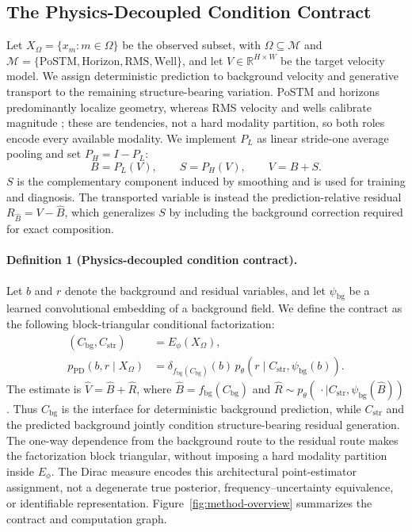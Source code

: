 \documentclass[letterpaper]{article}
\begin{document}
\subsection{The Physics-Decoupled Condition Contract}
Let $X_\Omega=\{x_m:m\in\Omega\}$ be the observed subset, with $\Omega\subseteq\mathcal M$ and $\mathcal M=\{\mathrm{PoSTM},\mathrm{Horizon},\mathrm{RMS},\mathrm{Well}\}$, and let $V\in\mathbb R^{H\times W}$ be the target velocity model. We assign deterministic prediction to background velocity and generative transport to the remaining structure-bearing variation. PoSTM and horizons predominantly localize geometry, whereas RMS velocity and wells calibrate magnitude \cite{stolt1978migration,dix1955velocities,hampson2001multiattribute}; these are tendencies, not a hard modality partition, so both roles encode every available modality. We implement $P_L$ as linear stride-one average pooling and set $P_H=I-P_L$:
\begin{equation}
B=P_L(V),\qquad S=P_H(V),\qquad V=B+S.
\label{eq:frequency-view}
\end{equation}
$S$ is the complementary component induced by smoothing and is used for training and diagnosis. The transported variable is instead the prediction-relative residual $R_{\hat B}=V-\hat B$, which generalizes $S$ by including the background correction required for exact composition.

\paragraph{Definition 1 (Physics-decoupled condition contract).}
Let $b$ and $r$ denote the background and residual variables, and let $\psi_{\mathrm{bg}}$ be a learned convolutional embedding of a background field. We define the contract as the following block-triangular conditional factorization:
\begin{equation}
\begin{aligned}
(C_{\mathrm{bg}},C_{\mathrm{str}})&=E_\phi(X_\Omega),\\
p_{\mathrm{PD}}(b,r\mid X_\Omega)
&=\delta_{f_{\mathrm{bg}}(C_{\mathrm{bg}})}(b)
\,p_\theta(r\mid C_{\mathrm{str}},\psi_{\mathrm{bg}}(b)).
\end{aligned}
\label{eq:asymmetric-factorization}
\end{equation}
The estimate is $\hat V=\hat B+\hat R$, where $\hat B=f_{\mathrm{bg}}(C_{\mathrm{bg}})$ and $\hat R\sim p_\theta(\,\cdot\mid C_{\mathrm{str}},\psi_{\mathrm{bg}}(\hat B))$. Thus $C_{\mathrm{bg}}$ is the interface for deterministic background prediction, while $C_{\mathrm{str}}$ and the predicted background jointly condition structure-bearing residual generation. The one-way dependence from the background route to the residual route makes the factorization block triangular, without imposing a hard modality partition inside $E_\phi$. The Dirac measure encodes this architectural point-estimator assignment, not a degenerate true posterior, frequency--uncertainty equivalence, or identifiable representation. Figure~\ref{fig:method-overview} summarizes the contract and computation graph.
\end{document}
